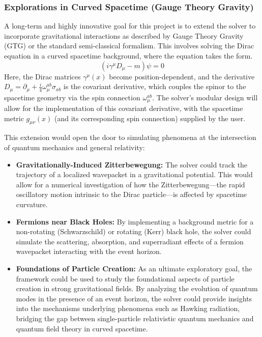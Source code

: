 \documentclass[11pt, letterpaper]{article}
\theoremstyle{definition}
\theoremstyle{remark}
\begin{document}
\subsubsection{Explorations in Curved Spacetime (Gauge Theory Gravity)}
A long-term and highly innovative goal for this project is to extend the solver
to incorporate gravitational interactions as described by Gauge Theory Gravity
(GTG) or the standard semi-classical formalism. This involves solving the Dirac
equation in a curved spacetime background, where the equation takes the form.
\[
	\left( i\gamma^\mu D_\mu - m \right)\psi = 0
\]
Here, the Dirac matrices $\gamma^\mu(x)$ become position-dependent, and the
derivative $D_\mu = \partial_\mu + \frac{i}{4}\omega_{\mu}^{ab}\sigma_{ab}$ is
the covariant derivative, which couples the spinor to the spacetime geometry via
the spin connection $\omega_{\mu}^{ab}$. The solver's modular design will allow
for the implementation of this covariant derivative, with the spacetime metric
$g_{\mu\nu}(x)$ (and its corresponding spin connection) supplied by the user.

This extension would open the door to simulating phenomena at the intersection
of quantum mechanics and general relativity:
\begin{itemize}
	\item \textbf{Gravitationally-Induced Zitterbewegung:} The solver could track
		the trajectory of a localized wavepacket in a gravitational potential. This
		would allow for a numerical investigation of how the Zitterbewegung---the
		rapid oscillatory motion intrinsic to the Dirac particle---is affected by
		spacetime curvature.
	\item \textbf{Fermions near Black Holes:} By implementing a background metric
		for a non-rotating (Schwarzschild) or rotating (Kerr) black hole, the solver
		could simulate the scattering, absorption, and superradiant effects of a
		fermion wavepacket interacting with the event horizon.
	\item \textbf{Foundations of Particle Creation:} As an ultimate exploratory
		goal, the framework could be used to study the foundational aspects of
		particle creation in strong gravitational fields. By analyzing the evolution
		of quantum modes in the presence of an event horizon, the solver could
		provide insights into the mechanisms underlying phenomena such as Hawking
		radiation, bridging the gap between single-particle relativistic quantum
		mechanics and quantum field theory in curved spacetime.
\end{itemize}
\end{document}
